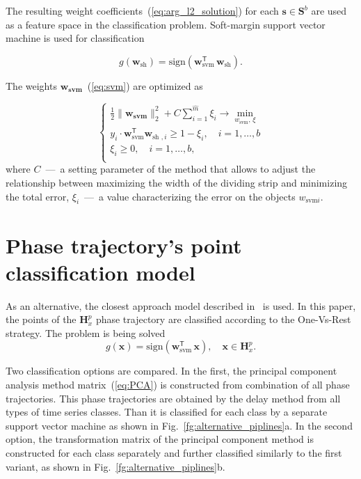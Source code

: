 \documentclass[12pt,twoside]{article}
\begin{document}
The resulting weight coefficients~(\ref{eq:arg_l2_solution}) for each $\mathbf{s} \in \mathbf{S}^{b}$ are used as a feature space in the classification problem. Soft-margin support vector machine is used for classification
 
\begin{equation}
    g(\mathbf{w}_{\text{sh}}) = \text{sign}(\mathbf{{w}}_{\text{svm}}^{\mathsf{T}}\,\mathbf{w}_{\text{sh}}).
\label{eq:svm}
\end{equation}

The weights $\mathbf{{w}_{\text{svm}}}$~(\ref{eq:svm}) are optimized as

\begin{equation}
\begin{cases}
    \frac{1}{2}\|\mathbf{{w}_{\text{svm}}}\|_2^2 + C\sum_{i=1}^{\hat{m}}\xi_i \xrightarrow{} \min_{{w}_{\text{svm}},\,\xi}\\
    y_i \cdot \mathbf{{w}}_{\text{svm}}^{\mathsf{T}}\mathbf{w}_{\text{sh },i} \geq 1 - \xi_i, \quad i = 1,\dots,b\\
    \xi_i \geq 0, \quad i = 1,\dots,b,\\
\end{cases}
\label{eq:svm_solutin}
\end{equation}
where $C$~---~a setting parameter of the method that allows to adjust the relationship between maximizing the width of the dividing strip and minimizing the total error, $\xi_i$~---~a value characterizing the error on the objects ${w}_{\text {svm}i}$.

\section{Phase trajectory's point classification model}
As an alternative, the closest approach model described in~\cite{Frank_2010} is used.
In this paper, the points of the $\mathbf{H}_{x}^{p}$ phase trajectory are classified according to the One-Vs-Rest strategy.
The problem is being solved
\begin{equation}
    g(\mathbf{x}) = \text{sign}(\mathbf{{w}}_{\text{svm}}^{\mathsf{T}}\,\mathbf{x}),
    \quad
    \mathbf{x} \in \mathbf{H}_{x}^{p}.
\label{eq:alternative_svm}
\end{equation}

Two classification options are compared.
In the first, the principal component analysis method matrix~(\ref{eq:PCA}) is constructed from combination of all phase trajectories.
This phase trajectories are obtained by the delay method from all types of time series classes.
Than it is classified for each class by a separate support vector machine as shown in Fig.~\ref{fg:alternative_piplines}a.
In the second option, the transformation matrix of the principal component method is constructed for each class separately and further classified similarly to the first variant, as shown in Fig.~\ref{fg:alternative_piplines}b.
\end{document}
